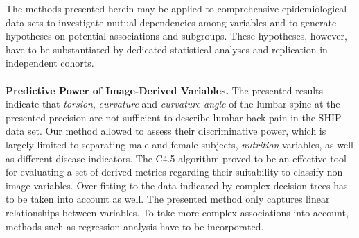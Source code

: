 \documentclass[a4paper,twoside]{style/article}
\begin{document}
The methods presented herein may be applied to comprehensive epidemiological data sets to investigate mutual dependencies among variables and to generate hypotheses on potential associations and subgroups.
%
These hypotheses, however, have to be substantiated by dedicated statistical analyses and replication in independent cohorts.
\\\\
\noindent \textbf{Predictive Power of Image-Derived Variables.}
The presented results indicate that \emph{torsion}, \emph{curvature} and \emph{curvature angle} of the lumbar spine at the presented precision are not sufficient to describe lumbar back pain in the SHIP data set.
Our method allowed to assess their discriminative power, which is largely limited to separating male and female subjects, \emph{nutrition} variables, as well as different disease indicators.
The C4.5 algorithm proved to be an effective tool for evaluating a set of derived metrics regarding their suitability to classify non-image variables.
Over-fitting to the data indicated by complex decision trees has to be taken into account as well.
The presented method only captures linear relationships between variables.
To take more complex associations into account, methods such as regression analysis have to be incorporated.
\\\\
\end{document}
